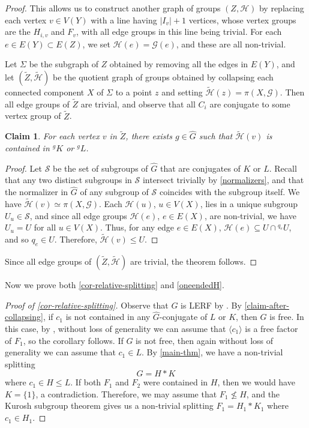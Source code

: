 \documentclass[a4paper]{amsart}
\newtheorem{claim}[lem]{Claim}
\theoremstyle{definition}
\theoremstyle{remark}
\newcommand{\G}{\mathcal G}
\begin{document}
\begin{proof}
This allows us to construct another graph of groups \((Z,\mathcal{H})\) by replacing each vertex \(v \in V(Y)\) with a line having \(|I_v|+1\) vertices, whose vertex groups are the \(H_{i,v}\) and \(F_v\), with all edge groups in this line being trivial. For each \(e \in E(Y) \subset E(Z)\), we set \(\mathcal{H}(e) = \G(e)\), and these are all non-trivial.

Let \(\Sigma\) be the subgraph of \(Z\) obtained by removing all the edges in \(E(Y)\), and let \((\widetilde{Z}, \widetilde{\mathcal{H}})\) be the quotient graph of groups obtained by collapsing each connected component \(X\) of \(\Sigma\) to a point \(z\) and setting \(\widetilde{\mathcal{H}}(z) = \pi(X,\G)\). Then all edge groups of \(\widetilde{Z}\) are trivial, and observe that all \(C_i\) are conjugate to some vertex group of \(\widetilde{Z}\).

\begin{claim} For each vertex \(v\) in \(\widetilde{Z}\), there exists \(g \in \widehat{G}\) such that \(\widetilde{\mathcal{H}}(v)\) is contained in \(^gK\) or \(^gL\).
\end{claim}
\begin{proof}
Let \(\mathcal{S}\) be the set of subgroups of \(\widehat{G}\) that are conjugates of \(K\) or \(L\). Recall that any two distinct subgroups in \(\mathcal{S}\) intersect trivially by \cref{normalizers}, and that the normalizer in \(\widehat{G}\) of any subgroup of \(\mathcal{S}\) coincides with the subgroup itself. We have \(\widetilde{\mathcal{H}}(v) \simeq \pi(X,\G)\). Each \(\mathcal{H}(u)\), \(u \in V(X)\), lies in a unique subgroup \(U_u \in \mathcal{S}\), and since all edge groups \(\mathcal{H}(e)\), \(e \in E(X)\), are non-trivial, we have \(U_u = U\) for all \(u \in V(X)\). Thus, for any edge \(e \in E(X)\), \(\mathcal{H}(e) \subseteq U \cap {^{q_e}U}\), and so \(q_e \in U\). Therefore, \(\widetilde{\mathcal{H}}(v) \leq U\).
\end{proof}

Since all edge groups of \((\widetilde{Z}, \widetilde{\mathcal{H}})\) are trivial, the theorem follows.
\end{proof}


Now we prove both \cref{cor-relative-splitting} and \cref{oneendedH}.

\begin{proof}[Proof of \cref{cor-relative-splitting}] Observe that  \(G\) is LERF by \cite[Thm. 1]{appel_subgroup_1984}. By \cref{claim-after-collapsing}, if \(c_1\) is not contained in any \(\widehat{G}\)-conjugate of \(L\) or \(K\), then \(G\) is free. In this case, by \cite[Prop. II.5.13]{LSbook}, without loss of generality we can assume that \(\langle c_1\rangle\) is a free factor of \(F_1\), so the corollary follows. If \(G\) is not free, then again without loss of generality we can assume that \(c_1 \in L\). By \cref{main-thm}, we have a non-trivial splitting \[G = H * K\] where \(c_1 \in H \leq L\).  If both \(F_1\) and \(F_2\) were contained in \(H\), then we would have \(K = \{1\}\), a contradiction. Therefore, we may assume that \(F_1 \not\leq H\), and the Kurosh subgroup theorem gives us a non-trivial splitting \(F_1 = H_1 * K_1\) where \(c_1 \in H_1\).
\end{proof}
\end{document}
